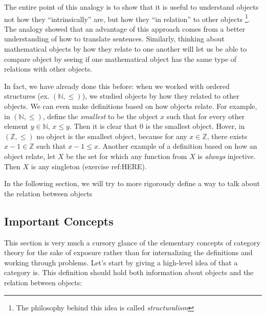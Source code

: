\documentclass{book}
\newcommand{\N}{{\mathbb{N}}}
\newcommand{\Z}{{\mathbb{Z}}}
\begin{document}
The entire point of this analogy is to show that it is useful to understand objects not how they ``intrinsically'' are,
but how they ``in relation'' to other objects \footnote{The philosophy behind this idea is called \emph{structuralism}}.
The analogy showed that an advantage of this approach comes from a better understanding of how to translate
sentences. Similarly, thinking about mathematical objects by how they relate to one another will let us be
able to compare object by seeing if one mathematical object has the same type of relations with other objects.

In fact, we have already done this before: when we worked with ordered structures (ex. $(\N, \le)$),  we studied objects by how they
related to other objects. We can even make definitions based on how objects relate. For example, in $(\N, \le)$, define the \emph{smallest}
to be the object $x$ such that for every other element $y \in \N$, $x \le y$. Then it is clear that $0$ is the smallest
object. Hover, in $(\Z, \le)$ no object is the smallest object, because for any $x \in \Z$, there exists $x-1 \in \Z$
such that $x-1 \le x$. Another example of a definition based on how an object relate, let $X$ be the set for which any
function from $X$ is \emph{always} injective. Then $X$ is any singleton (exercise ref:HERE).

In the following section, we will try to more rigorously define a way to talk about the relation between objects

\subsection{Important Concepts}

This section is very much a cursory glance of the elementary concepts of category theory for the sake of
exposure rather than for internalizing the definitions and working through problems. Let's start by giving a
high-level idea of that a category is. This definition should hold both information about objects and the
relation between objects:
\end{document}
